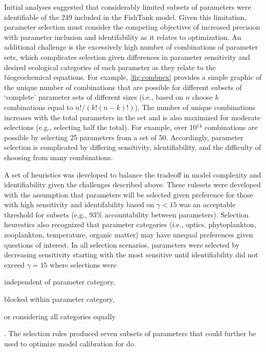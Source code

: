 \documentclass[letterpaper,12pt,oneside]{article}\usepackage[]{graphicx}\usepackage[]{color}
\begin{document}
Initial analyses suggested that considerably limited subsets of parameters were identifiable of the 249 included in the FishTank model.  Given this limitation, parameter selection must consider the competing objectives of increased precision with parameter inclusion and identifability as it relates to optimization.  An additional challenge is the excessively high number of combinations of parameter sets, which complicates selection given differences in parameter sensitivity and desired ecological categories of each parameter as they relate to the biogeochemical equations.  For example, \cref{fig:combnex} provides a simple graphic of the unique number of combinations that are possible for different subsets of `complete' parameter sets of different sizes (i.e., based on $n$ choose $k$ combinations equal to $n!/\left(k!\left(n-k\right)!\right)$).  The number of unique combinations increases with the total parameters in the set and is also maximized for moderate selections (e.g., selecting half the total).  For example, over 10$^14$ combinations are possible by selecting 25 parameters from a set of 50.  Accordingly, parameter selection is complicated by differing sensitivity, identifiability, and the difficulty of choosing from many combinations.

A set of heuristics was developed to balance the tradeoff in model complexity and identifiability given the challenges described above.  These rulesets were developed with the assumption that parameters will be selected given preference for those with high sensitivity and identifability based on $\gamma < 15$ was an acceptable threshold for subsets (e.g., 93\% accountability between parameters).  Selection heurestics also recognized that parameter categories (i.e., optics, phytoplankton, zooplankton, temperature, organic matter) may have unequal preferences given questions of interest.  In all selection scenarios, parameters were selected by decreasing sensitivity starting with the most sensitive until identifiability did not exceed $\gamma = 15$ where selections were \begin{inparaenum}[1\upshape)]
\item independent of parameter category,
\item blocked within parameter category,
\item or considering all categories equally
\end{inparaenum}.  The selection rules produced seven subsets of parameters that could further be used to optimize model calibration for \ac{do}.
\end{document}
